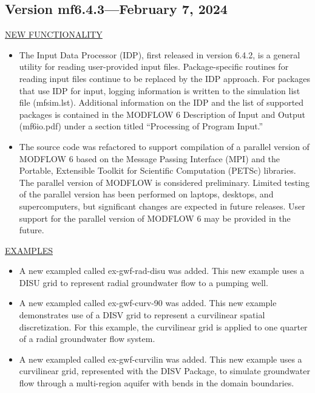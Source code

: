 	
	\subsection{Version mf6.4.3---February 7, 2024}

	\underline{NEW FUNCTIONALITY}
	\begin{itemize}
		\item The Input Data Processor (IDP), first released in version 6.4.2, is a general utility for reading user-provided input files.  Package-specific routines for reading input files continue to be replaced by the IDP approach.  For packages that use IDP for input, logging information is written to the simulation list file (mfsim.lst).  Additional information on the IDP and the list of supported packages is contained in the MODFLOW 6 Description of Input and Output (mf6io.pdf) under a section titled ``Processing of Program Input.''
		\item The source code was refactored to support compilation of a parallel version of MODFLOW 6 based on the Message Passing Interface (MPI) and the Portable, Extensible Toolkit for Scientific Computation (PETSc) libraries.  The parallel version of MODFLOW is considered preliminary. Limited testing of the parallel version has been performed on laptops, desktops, and supercomputers, but significant changes are expected in future releases. User support for the parallel version of MODFLOW 6 may be provided in the future.
	\end{itemize}

	\underline{EXAMPLES}
	\begin{itemize}
		\item A new exampled called ex-gwf-rad-disu was added.  This new example uses a DISU grid to represent radial groundwater flow to a pumping well.
		\item A new exampled called ex-gwf-curv-90 was added.  This new example demonstrates use of a DISV grid to represent a curvilinear spatial discretization.  For this example, the curvilinear grid is applied to one quarter of a radial groundwater flow system.
		\item A new exampled called ex-gwf-curvilin was added.  This new example uses a curvilinear grid, represented with the DISV Package, to simulate groundwater flow through a multi-region aquifer with bends in the domain boundaries.
	\end{itemize}

